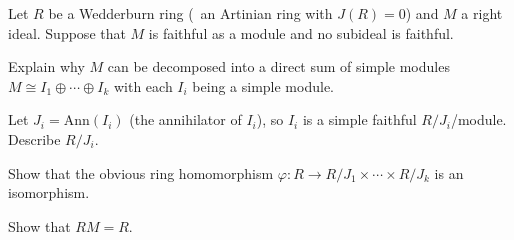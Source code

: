 Let $R$ be a Wedderburn ring (\ie\ an Artinian ring with $J(R)=0$) and
$M$ a right ideal. Suppose that $M$ is faithful as a module and no
subideal is faithful.
\begin{alist}
\item Explain why $M$ can be decomposed into a direct sum of simple
modules \ie\ $M\cong I_1\oplus\cdots\oplus I_k$ with each $I_i$ being
a simple module.
\item Let $J_i=\text{Ann}(I_i)$ (the annihilator of $I_i$), so $I_i$ is a
simple faithful $R/J_i$/module. Describe $R/J_i$.
\item Show that the obvious ring homomorphism $\varphi:R\rightarrow
R/J_1\times \cdots \times R/J_k$ is an isomorphism.
\item Show that $RM=R$. 
\end{alist}
